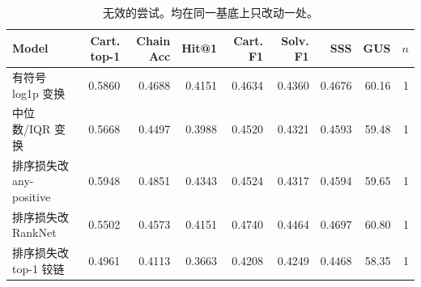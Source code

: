 \begin{table}[t]
\centering
\small
\caption{无效的尝试。均在同一基底上只改动一处。}
\label{tab:negative}
\begin{tabular}{lrrrrrrrr}
\toprule
Model & Cart. top-1 & Chain Acc & Hit@1 & Cart. F1 & Solv. F1 & SSS & GUS & $n$ \\
\midrule
有符号 log1p 变换 & 0.5860 & 0.4688 & 0.4151 & 0.4634 & 0.4360 & 0.4676 & 60.16 & 1 \\
中位数/IQR 变换 & 0.5668 & 0.4497 & 0.3988 & 0.4520 & 0.4321 & 0.4593 & 59.48 & 1 \\
排序损失改 any-positive & 0.5948 & 0.4851 & 0.4343 & 0.4524 & 0.4317 & 0.4594 & 59.65 & 1 \\
排序损失改 RankNet & 0.5502 & 0.4573 & 0.4151 & 0.4740 & 0.4464 & 0.4697 & 60.80 & 1 \\
排序损失改 top-1 铰链 & 0.4961 & 0.4113 & 0.3663 & 0.4208 & 0.4249 & 0.4468 & 58.35 & 1 \\
\bottomrule
\end{tabular}
\vspace{2pt}{\footnotesize $n$ 列给出重复次数。对照是「rank-gauss + 默认超参」那一行（表 5 第二行，Cart.\ top-1 $0.5878$）。列出这些失败尝试是为了说明搜索范围，也避免后续重复投入。}
\end{table}
